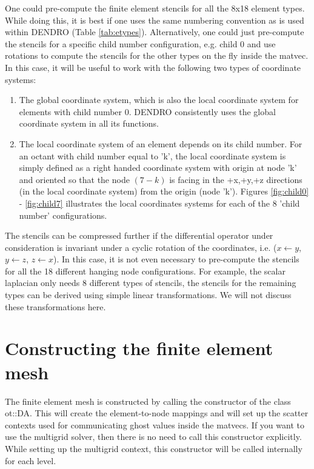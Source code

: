 \documentclass[12pt,reqno,a4paper]{report}
\numberwithin{equation}{section}
\begin{document}
One could pre-compute the finite element stencils for all the 8x18 element types. While doing this, it is best if one uses the same numbering convention as is used within DENDRO (Table \ref{tab:etypes}).  Alternatively, one could just pre-compute the stencils for a specific child number configuration, e.g. child 0 and use rotations to compute the stencils for the other types on the fly inside the matvec. In this case, it will be useful to work with the following two types of coordinate systems:
\begin{enumerate}
\item The global coordinate system, which is also the local coordinate system for elements with child number 0. DENDRO consistently uses the global coordinate system in all its functions. 
\item The local coordinate system of an element depends on its child number. For an octant with child number equal to 'k', the local coordinate system is simply defined as a right handed coordinate system with origin at node 'k' and oriented so that the node $(7-k)$ is facing in the +x,+y,+z directions (in the local coordinate system) from the origin (node 'k'). Figures \ref{fig:child0} - \ref{fig:child7} illustrates the local coordinates systems for each of the 8 'child number' configurations. 
\end{enumerate}

The stencils can be compressed further if the differential operator under consideration is invariant under a cyclic rotation of the coordinates, i.e. ($x \leftarrow y$, $y \leftarrow z$, $z \leftarrow x$). In this case, it is not even necessary to pre-compute the stencils for all the 18 different hanging node configurations. For example, the scalar laplacian only needs 8 different types of stencils, the stencils for the remaining types can be derived using simple linear transformations. We will not discuss these transformations here. 

\section{Constructing the finite element mesh}
\label{sec:daconstructor}
The finite element mesh is constructed by calling the constructor of the class ot::DA. This will create the element-to-node mappings and will set up the scatter contexts used for communicating ghost values inside the matvecs. If you want to use the multigrid solver, then there is no need to call this constructor explicitly. While setting up the multigrid context, this constructor will be called internally for each level.
\end{document}
